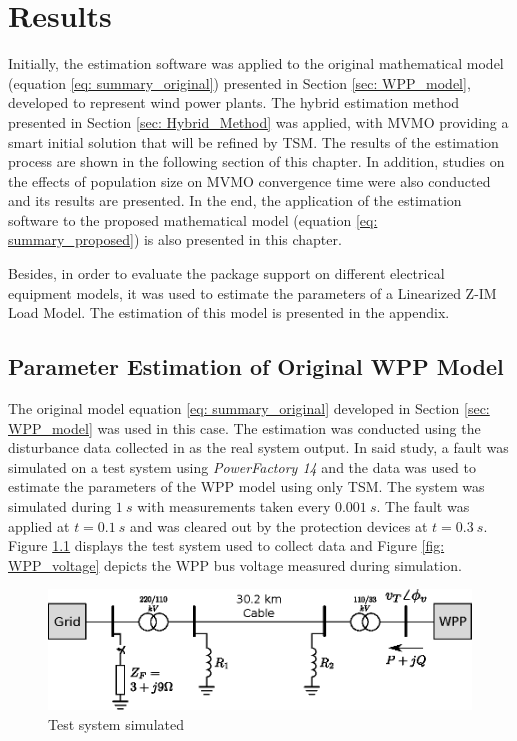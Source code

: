 \chapter{Results}
\label{ch: Results}

Initially, the estimation software was applied to the original mathematical model (equation \ref{eq: summary_original}) presented in Section \ref{sec: WPP_model}, developed to represent wind power plants. The hybrid estimation method presented in Section \ref{sec: Hybrid_Method} was applied, with MVMO providing a smart initial solution that will be refined by TSM. The results of the estimation process are shown in the following section of this chapter. In addition, studies on the effects of population size on MVMO convergence time were also conducted and its results are presented. In the end, the application of the estimation software to the proposed mathematical model (equation \ref{eq: summary_proposed}) is also presented in this chapter.

Besides, in order to evaluate the package support on different electrical equipment models, it was used to estimate the parameters of a Linearized Z-IM Load Model. The estimation of this model is presented in the appendix.

\section{Parameter Estimation of Original WPP Model}

The original model equation \eqref{eq: summary_original} developed in Section \ref{sec: WPP_model} was used in this case. The estimation was conducted using the disturbance data collected in \cite{Cari2015} as the real system output. In said study, a fault was simulated on a test system using \textit{PowerFactory 14} and the data was used to estimate the parameters of the WPP model using only TSM. The system was simulated during $1\ s$ with measurements taken every $0.001\ s$. The fault was applied at $t=0.1\ s$ and was cleared out by the protection devices at $t=0.3\ s$. Figure \ref{fig: test_system} displays the test system used to collect data and Figure \ref{fig: WPP_voltage} depicts the WPP bus voltage measured during simulation.

\begin{figure}[!h]
	\caption{Test system simulated}
	\begin{center}
		\includegraphics[scale=1]{Images/Cari_test_system.eps}
	\end{center}
	\label{fig: test_system}
\end{figure}

